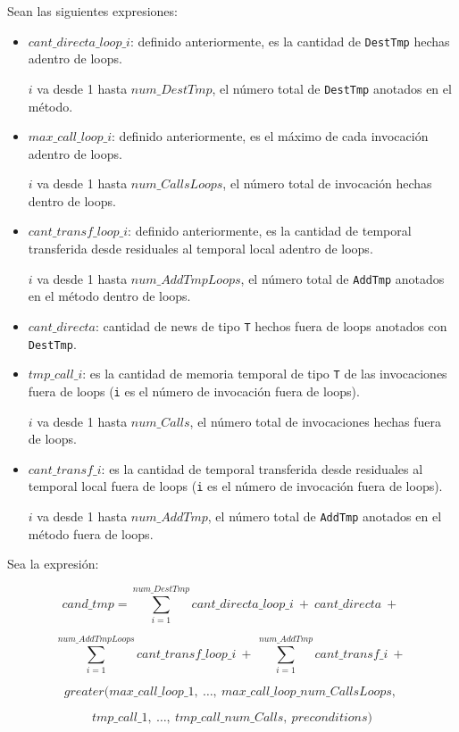 \documentclass[12pt,a4paper]{article}
\newcommand\mono[1]{\texttt{#1}}
\begin{document}
				Sean las siguientes expresiones:
				\begin{itemize}
					\item
						$cant\_directa\_loop\_i$: definido anteriormente, es la cantidad de \mono{DestTmp} hechas adentro de loops.

						$i$ va desde 1 hasta $num\_DestTmp$, el número total de \mono{DestTmp} anotados en el método.
					\item
						$max\_call\_loop\_i$: definido anteriormente, es el máximo de cada invocación adentro de loops.

						$i$ va desde 1 hasta $num\_CallsLoops$, el número total de invocación hechas dentro de loops.
					\item
							$cant\_transf\_loop\_i$: definido anteriormente, es la cantidad de temporal transferida desde residuales al temporal local adentro de loops.

							$i$ va desde 1 hasta $num\_AddTmpLoops$, el número total de \mono{AddTmp} anotados en el método dentro de loops.
					\item
						$cant\_directa$: cantidad de news de tipo \mono{T} hechos fuera de loops anotados con \mono{DestTmp}.
					\item
						$tmp\_call\_i$: es la cantidad de memoria temporal de tipo \mono{T} de las invocaciones fuera de loops (\mono{i} es el número de invocación fuera de loops).

						$i$ va desde 1 hasta $num\_Calls$, el número total de invocaciones hechas fuera de loops.
					\item
						$cant\_transf\_i$: es la cantidad de temporal transferida desde residuales al temporal local fuera de loops (\mono{i} es el número de invocación fuera de loops).

						$i$ va desde 1 hasta $num\_AddTmp$, el número total de \mono{AddTmp} anotados en el método fuera de loops.
				\end{itemize}

				Sea la expresión:

					$$cand\_tmp = \sum_{i=1}^{num\_DestTmp}{cant\_directa\_loop\_i}\ +\ cant\_directa\ +\ $$

					$$\sum_{i=1}^{num\_AddTmpLoops}{cant\_transf\_loop\_i}\ +\ \sum_{i=1}^{num\_AddTmp}{cant\_transf\_i}\ +\ $$

					$$greater(max\_call\_loop\_1,\ \dots,\ max\_call\_loop\_num\_CallsLoops,\ $$

					$$tmp\_call\_1,\ \dots,\ tmp\_call\_num\_Calls,\ preconditions)$$
\end{document}
